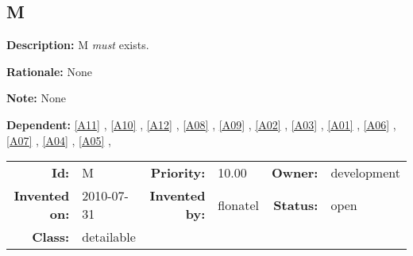 \subsection{M}\label{M}
\textbf{Description:} M \textsl{must} exists.

\textbf{Rationale:} None

\textbf{Note:} None

\textbf{Dependent:} \ref{A11} , \ref{A10} , \ref{A12} , \ref{A08} , \ref{A09} , \ref{A02} , \ref{A03} , \ref{A01} , \ref{A06} , \ref{A07} , \ref{A04} , \ref{A05} , 

\par
{\small \begin{center}\begin{tabular}{rlrlrl}
\textbf{Id:} & M & \textbf{Priority:} & 10.00 & \textbf{Owner:} & development \\ 
\textbf{Invented on:} & 2010-07-31 & \textbf{Invented by:} & flonatel & \textbf{Status:} & open \\ 
\textbf{Class:} & detailable & & & & \\ 
\end{tabular}\end{center} }
